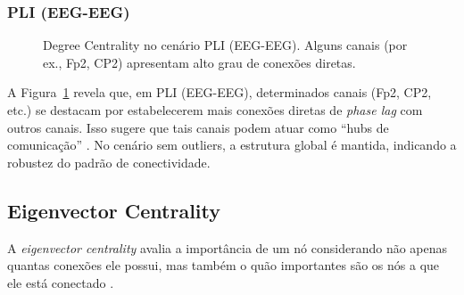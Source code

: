 \subsubsection{PLI (EEG-EEG)}
\begin{figure}[htb]
    \centering
    \quad
    \caption{Degree Centrality no cenário PLI (EEG-EEG). Alguns canais (por ex., Fp2, CP2) apresentam alto grau de conexões diretas.}
    \label{fig:dc_pli_eegeeg}
\end{figure}

A Figura~\ref{fig:dc_pli_eegeeg} revela que, em PLI (EEG-EEG), determinados canais (Fp2, CP2, etc.) se destacam por estabelecerem mais conexões diretas de \emph{phase lag} com outros canais. Isso sugere que tais canais podem atuar como “hubs de comunicação” \cite{newman2010networks}. No cenário sem outliers, a estrutura global é mantida, indicando a robustez do padrão de conectividade.

\subsection{Eigenvector Centrality}
A \emph{eigenvector centrality} avalia a importância de um nó considerando não apenas quantas conexões ele possui, mas também o quão importantes são os nós a que ele está conectado \cite{bonacich1972factoring}.

